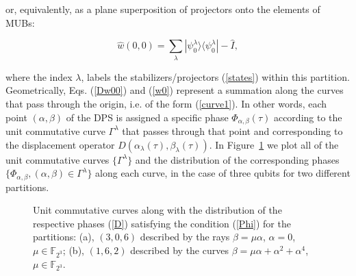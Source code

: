 \documentclass[quantumrep,article,submit,pdftex,moreauthors]{Definitions/mdpi}
\begin{document}
or, equivalently, as a plane superposition of projectors onto the elements of
MUBs:

\begin{equation}
  \hat{w}\left( 0,0\right)
  = \sum_{\lambda } |\psi _{0}^{\lambda }\rangle
  \langle \psi _{0}^{\lambda }| - \hat{I},
  \label{w0}
\end{equation}

where the index $\lambda$, labels the stabilizers/projectors (\ref{states})
within this partition. Geometrically, Eqs. (\ref{Dw00}) and (\ref{w0}) represent
a summation along the curves that pass through the origin, i.e. of the form
(\ref{curve1}). In other words, each point $(\alpha, \beta)$ of the DPS is
assigned a specific phase $\Phi_{\alpha, \beta}\left( \tau \right)$ according
to the unit commutative curve $\Gamma^{\lambda}$ that passes through that point
and corresponding to the displacement operator
$D\left(\alpha_{\lambda}(\tau),\beta_{\lambda}(\tau)\right)$. {\color{teal} In
  Figure~\ref{fig1} we plot all of the unit commutative curves
  $\{\Gamma^{\lambda}\}$ and the distribution of the corresponding phases
  $\{\Phi_{\alpha,\beta},(\alpha,\beta) \in \Gamma^{\lambda}\}$ along each
  curve, in the case of three qubits for two different partitions.}

\begin{figure}[ht]
  \color{teal}
  \centering
  \caption{
    \color{teal}
    Unit commutative curves along with the distribution of the respective phases
    (\ref{D}) satisfying the condition (\ref{Phi}) for the partitions: (a),
    $(3,0,6)$ described by the rays $\beta = \mu \alpha$, $\alpha = 0$, $\mu \in
    \mathbb F_{2^{3}}$; (b), $(1,6,2)$ described by the curves $\beta = \mu
    \alpha + \alpha^2 + \alpha^{4}$, $\mu \in \mathbb F_{2^{3}}$.
  }
  \label{fig1}
\end{figure}
\end{document}
